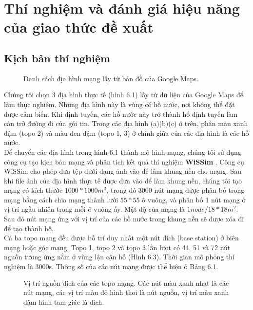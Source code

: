 \documentclass[12pt]{report}
\begin{document}
\chapter{Thí nghiệm và đánh giá hiệu năng của giao thức đề xuất}
\label{sec:5}
\section{Kịch bản thí nghiệm}
\label{sec:5.1}
\begin{figure}[h]
\centering
{}
\caption{Danh sách địa hình mạng lấy từ bản đồ của Google Maps.}
\label{fig:globfig}
\end{figure}
Chúng tôi chọn 3 địa hình thực tế (hình 6.1) lấy từ dữ liệu của Google Maps để làm thực nghiệm. Những địa hình này là vùng có hồ nước, nơi không thể đặt được cảm biến. Khi định tuyến, các hồ nước này trở thành hố định tuyến làm cản trở đường đi của gói tin. Trong các địa hình (a)(b)(c) ở trên, phần màu xanh đậm (topo 2) và màu đen đậm (topo 1, 3) ở chính giữa của các địa hình là các hồ nước.\\
Để chuyển các địa hình trong hình 6.1 thành mô hình mạng, chúng tôi sử dụng công cụ tạo kịch bản mạng và phân tích kết quả thí nghiệm \textbf{WiSSim} \cite{wissim}. Công cụ WiSSim cho phép đưa tệp dưới dạng ảnh vào để làm khung nền cho mạng. Sau khi file ảnh của địa hình thực tế được đưa vào để làm khung nền, chúng tôi tạo mạng có kích thước $ 1000*1000m^{2} $, trong đó 3000 nút mạng được phân bố trong mạng bằng cách chia mạng thành lưới $ 55 * 55 $ ô vuông, và phân bố 1 nút mạng ở vị trí ngẫu nhiên trong mỗi ô vuông ấy. Mật độ của mạng là $ 1  node/18 * 18 m^{2} $. Sau đó nút mạng ứng với vị trí của các hồ nước trong khung nền sẽ được xóa đi để tạo thành hố.\\
Cả ba topo mạng đều được bố trí duy nhất một nút đích (base station) ở biên mạng hoặc góc mạng. Topo 1, topo 2 và topo 3 lần lượt có 44, 51 và 72 nút nguồn tương ứng nằm ở vùng lận cận hố (Hình 6.3). Thời gian mô phỏng thí nghiệm là 3000s. Thông số của các nút mạng được thể hiện ở Bảng 6.1. 

\begin{figure}[H]
\centering
{}
\caption[Vị trí nguồn đích của các topo mạng]{Vị trí nguồn đích của các topo mạng. Các nút màu xanh nhạt là các nút mạng, các vị trí màu đỏ hình thoi là nút nguồn, vị trí màu xanh đậm hình tam giác là đích.}
\label{fig:globfig}
\end{figure}
\end{document}
